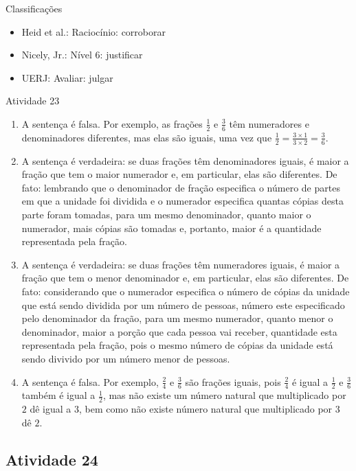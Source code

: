 \begin{multicols}{2}
Classificações
\begin{itemize} %
  \item Heid et al.: Raciocínio: corroborar
  \item Nicely, Jr.: Nível 6: justificar
  \item UERJ: Avaliar: julgar
\end{itemize}


\begin{resposta*}{Atividade 23}
\begin{enumerate} [\quad a)] %
    \item A sentença é falsa. Por exemplo, as frações $\frac{1}{2}$ e 
$\frac{3}{6}$ têm numeradores e denominadores diferentes, mas elas são iguais, 
uma vez que $\frac{1}{2} = \frac{3 \times 1}{3 \times 2} = \frac{3}{6}$.
    \item A sentença é verdadeira: se duas frações têm denominadores iguais, é 
maior a fração que tem o maior numerador e, em particular, elas são diferentes. 
De fato: lembrando que o denominador de fração especifica o número de partes em 
que a unidade foi dividida e o numerador especifica quantas cópias desta parte 
foram tomadas, para um mesmo denominador, quanto maior o numerador, mais cópias 
são tomadas e, portanto, maior é a quantidade representada pela fração.
    \item  A sentença é verdadeira: se duas frações têm numeradores iguais, é 
maior a fração que tem o menor denominador e, em particular, elas são 
diferentes. De fato: considerando que o numerador especifica o número de cópias 
da unidade que está sendo dividida por um número de pessoas, número este 
especificado pelo denominador da fração, para um mesmo numerador, quanto menor o 
denominador, maior a porção que cada pessoa vai receber, quantidade esta 
representada pela fração, pois o mesmo número de cópias da unidade está sendo 
divivido por um número menor de pessoas.
    \item A sentença é falsa. Por exemplo, $\frac{2}{4}$ e $\frac{3}{6}$ são 
frações iguais, pois $\frac{2}{4}$ é igual a $\frac{1}{2}$ e $\frac{3}{6}$ 
também é igual a $\frac{1}{2}$, mas não existe um número natural que 
multiplicado por $2$ dê igual a $3$, bem como não existe número natural que 
multiplicado por $3$ dê $2$.
\end{enumerate}
\end{resposta*}

\subsection{Atividade 24}


\end{multicols}
